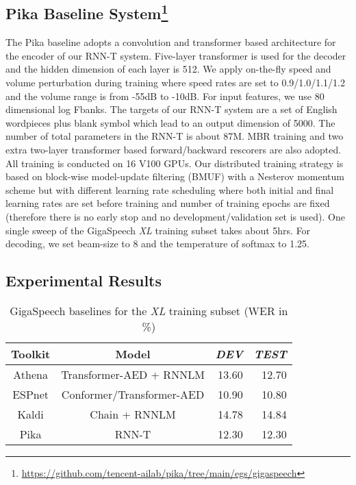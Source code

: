 \documentclass[a4paper]{article}
\begin{document}
\subsection[Pika Baseline System]{Pika Baseline System\footnote{\url{https://github.com/tencent-ailab/pika/tree/main/egs/gigaspeech}}\label{foot:pika}}
The Pika baseline adopts a convolution and transformer based architecture \cite{Weng2020} for the encoder of our RNN-T system. Five-layer transformer is used for the decoder and the hidden dimension of each layer is 512. We apply on-the-fly speed and volume perturbation during training where speed rates are set to 0.9/1.0/1.1/1.2 and the volume range is from -55dB to -10dB. For input features, we use 80 dimensional log Fbanks. The targets of our RNN-T system are a set of English wordpieces plus blank symbol which lead to an output dimension of 5000. The number of total parameters in the RNN-T is about 87M. MBR training and two extra two-layer transformer based forward/backward rescorers are also adopted. All training is conducted on 16 V100 GPUs. Our distributed training strategy is based on block-wise model-update filtering (BMUF) with a Nesterov momentum scheme but with different learning rate scheduling \cite{Weng2020} where both initial and final learning rates are set before training and number of training
epochs are fixed (therefore there is no early stop and no
development/validation set is used). One single sweep of the GigaSpeech \textit{XL} training subset takes about 5hrs. For decoding, we set beam-size to 8 and the temperature of softmax to 1.25.

\subsection{Experimental Results}
\begin{table}[t]
  \caption{GigaSpeech baselines for the \textit{XL} training subset (WER in \%)}
  \vspace{-2ex}
  \label{tab:toolkit_baseline}
  \centering
  \begin{tabular}{c|c|rr}
    \toprule
    \textbf{Toolkit}                      & \textbf{Model}               & \textbf{\textit{DEV}}    & \textbf{\textit{TEST}} \\
    \midrule
    Athena                                 & Transformer-AED + RNNLM      & 13.60                & 12.70 \\
    ESPnet                                 & Conformer/Transformer-AED    & 10.90                & 10.80 \\
    Kaldi                                  & Chain + RNNLM                & 14.78                & 14.84 \\
    Pika                                   & RNN-T                        & 12.30                & 12.30 \\
    \bottomrule
  \end{tabular}
\end{table}
\end{document}
